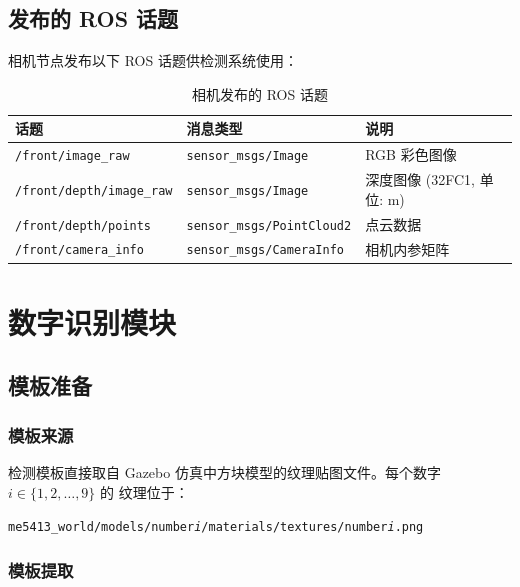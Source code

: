 \documentclass[12pt,a4paper]{article}
\begin{document}
\subsection{发布的 ROS 话题}

相机节点发布以下 ROS 话题供检测系统使用：

\begin{table}[H]
\centering
\caption{相机发布的 ROS 话题}
\label{tab:camera_topics}
\begin{tabular}{@{}lll@{}}
\toprule
\textbf{话题} & \textbf{消息类型} & \textbf{说明} \\
\midrule
\texttt{/front/image\_raw} & \texttt{sensor\_msgs/Image} & RGB 彩色图像 \\
\texttt{/front/depth/image\_raw} & \texttt{sensor\_msgs/Image} & 深度图像 (32FC1, 单位: m) \\
\texttt{/front/depth/points} & \texttt{sensor\_msgs/PointCloud2} & 点云数据 \\
\texttt{/front/camera\_info} & \texttt{sensor\_msgs/CameraInfo} & 相机内参矩阵 \\
\bottomrule
\end{tabular}
\end{table}

\section{数字识别模块}
\label{sec:detection}

\subsection{模板准备}

\subsubsection{模板来源}

检测模板直接取自 Gazebo 仿真中方块模型的纹理贴图文件。每个数字 $i \in \{1, 2, \dots, 9\}$ 的
纹理位于：
\begin{center}
\texttt{me5413\_world/models/number\textit{i}/materials/textures/number\textit{i}.png}
\end{center}

\subsubsection{模板提取}
\end{document}

